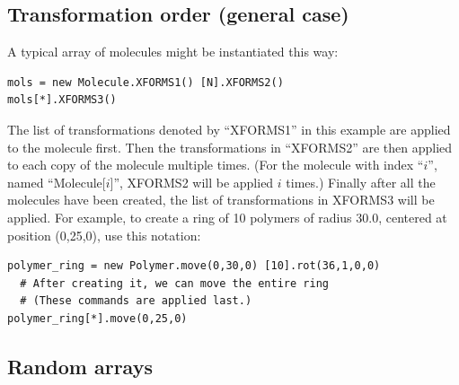 \documentclass[11pt]{article}
\begin{document}
\subsection{Transformation order (general case)}
\label{sec:xform_order}
A typical array of molecules might be instantiated this way:
\begin{verbatim}
mols = new Molecule.XFORMS1() [N].XFORMS2()
mols[*].XFORMS3()
\end{verbatim}
The list of transformations denoted by ``XFORMS1'' in this example
are applied to the molecule first.
Then the transformations in ``XFORMS2'' are then applied to each
copy of the molecule multiple times.  
(For the molecule with index ``$i$'', named ``Molecule[$i$]'',
XFORMS2 will be applied $i$ times.)
Finally after all the molecules have been created, the list
of transformations in XFORMS3 will be applied.
For example, to create a ring of 10 polymers of radius 30.0, 
centered at position (0,25,0), use this notation:
\begin{verbatim}
polymer_ring = new Polymer.move(0,30,0) [10].rot(36,1,0,0)
  # After creating it, we can move the entire ring 
  # (These commands are applied last.)
polymer_ring[*].move(0,25,0)
\end{verbatim}


\subsection{Random arrays}
\label{sec:random_arrays}
\end{document}
